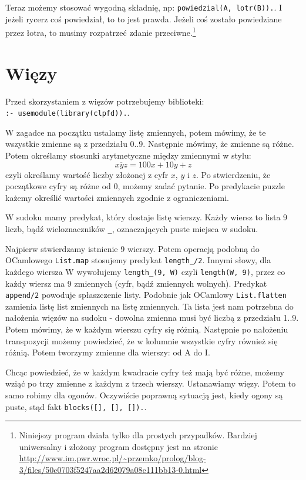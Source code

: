 \documentclass[12pt,a4paper]{article}
\begin{document}
Teraz możemy stosować wygodną składnię, np: \verb+powiedzial(A, lotr(B)).+. I jeżeli rycerz coś powiedział, to to jest prawda. Jeżeli coś zostało powiedziane przez łotra, to musimy rozpatrzeć zdanie przeciwne.\footnote{Niniejszy program działa tylko dla prostych przypadków. Bardziej uniwersalny i złożony program dostępny jest na stronie \url{http://www.im.pwr.wroc.pl/~przemko/prolog/blog-3/files/50c0703f5247aa2d62079a08c111bb13-0.html}}

\section{Więzy}
Przed skorzystaniem z więzów potrzebujemy biblioteki:\\\verb+:- usemodule(library(clpfd)).+.

W zagadce na początku ustalamy listę zmiennych, potem mówimy, że te wszystkie zmienne są z przedziału 0..9. Następnie mówimy, że zmienne są różne. Potem określamy stosunki arytmetyczne między zmiennymi w stylu:
\begin{equation}
\overline{xyz} = 100x+10y+z
\end{equation}
czyli określamy wartość liczby złożonej z cyfr $x$, $y$ i $z$. Po stwierdzeniu, że początkowe cyfry są różne od 0, możemy zadać pytanie. Po predykacie puzzle każemy określić wartości zmiennych zgodnie z ograniczeniami.

W sudoku mamy predykat, który dostaje listę wierszy. Każdy wiersz to lista 9 liczb, bądź wieloznaczników \verb+_+, oznaczających puste miejsca w sudoku.

Najpierw stwierdzamy istnienie 9 wierszy. Potem operacją podobną do OCamlowego \verb+List.map+ stosujemy predykat \verb+length_/2+. Innymi słowy, dla każdego wiersza W wywołujemy \verb+length_(9, W)+ czyli \verb+length(W, 9)+, przez co każdy wiersz ma 9 zmiennych (cyfr, bądź zmiennych wolnych). Predykat \verb+append/2+ powoduje spłaszczenie listy. Podobnie jak OCamlowy \verb+List.flatten+ zamienia listę list zmiennych na listę zmiennych. Ta lista jest nam potrzebna do nałożenia więzów na sudoku - dowolna zmienna musi być liczbą z przedziału 1..9. Potem mówimy, że w każdym wierszu cyfry się różnią. Następnie po nałożeniu transpozycji możemy powiedzieć, że w kolumnie wszystkie cyfry również się różnią. Potem tworzymy zmienne dla wierszy: od A do I.

Chcąc powiedzieć, że w każdym kwadracie cyfry też mają być różne, możemy wziąć po trzy zmienne z każdym z trzech wierszy. Ustanawiamy więzy. Potem to samo robimy dla ogonów. Oczywiście poprawną sytuacją jest, kiedy ogony są puste, stąd fakt \verb+blocks([], [], []).+.
\end{document}
